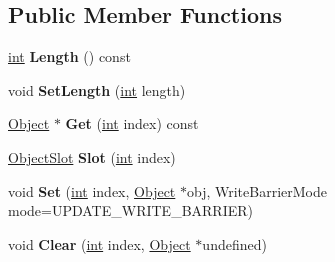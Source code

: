 \subsection*{Public Member Functions}
\begin{DoxyCompactItemize}
\item 
\mbox{\label{classv8_1_1internal_1_1ArrayList_a71ebeff949ffb2b1b7e2ef2545190f72}} 
\mbox{\hyperlink{classint}{int}} {\bfseries Length} () const
\item 
\mbox{\label{classv8_1_1internal_1_1ArrayList_a15b456ed07c5c716ba0d7fa5c8701945}} 
void {\bfseries Set\+Length} (\mbox{\hyperlink{classint}{int}} length)
\item 
\mbox{\label{classv8_1_1internal_1_1ArrayList_a27a18433e623f81553496a3d3a7d6e6c}} 
\mbox{\hyperlink{classv8_1_1internal_1_1Object}{Object}} $\ast$ {\bfseries Get} (\mbox{\hyperlink{classint}{int}} index) const
\item 
\mbox{\label{classv8_1_1internal_1_1ArrayList_ace0aaaafd860959c829bb6f7fd28c3ca}} 
\mbox{\hyperlink{classv8_1_1internal_1_1ObjectSlot}{Object\+Slot}} {\bfseries Slot} (\mbox{\hyperlink{classint}{int}} index)
\item 
\mbox{\label{classv8_1_1internal_1_1ArrayList_af930b7ecbce4bcf913f1cbf3e153c409}} 
void {\bfseries Set} (\mbox{\hyperlink{classint}{int}} index, \mbox{\hyperlink{classv8_1_1internal_1_1Object}{Object}} $\ast$obj, Write\+Barrier\+Mode mode=U\+P\+D\+A\+T\+E\+\_\+\+W\+R\+I\+T\+E\+\_\+\+B\+A\+R\+R\+I\+ER)
\item 
\mbox{\label{classv8_1_1internal_1_1ArrayList_af35b1f83c87e11bb5671f89f4e09b90d}} 
void {\bfseries Clear} (\mbox{\hyperlink{classint}{int}} index, \mbox{\hyperlink{classv8_1_1internal_1_1Object}{Object}} $\ast$undefined)
\end{DoxyCompactItemize}
